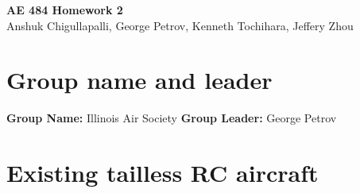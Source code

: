 




\begin{center}
    {\Large\textbf{AE 484 Homework 2}}\\
    Anshuk Chigullapalli, George Petrov, Kenneth Tochihara, Jeffery Zhou\\

\end{center}


\section{Group name and leader}

    \textbf{Group Name:} Illinois Air Society %
    \textbf{Group Leader:} George Petrov %

\section{Existing tailless RC aircraft}

